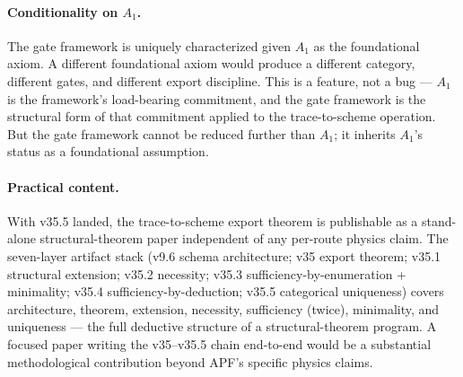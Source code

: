 \paragraph{Conditionality on $A_1$.} The gate framework is uniquely characterized given $A_1$ as the foundational axiom. A different foundational axiom would produce a different category, different gates, and different export discipline. This is a feature, not a bug --- $A_1$ is the framework's load-bearing commitment, and the gate framework is the structural form of that commitment applied to the trace-to-scheme operation. But the gate framework cannot be reduced further than $A_1$; it inherits $A_1$'s status as a foundational assumption.

\paragraph{Practical content.} With v35.5 landed, the trace-to-scheme export theorem is publishable as a stand-alone structural-theorem paper independent of any per-route physics claim. The seven-layer artifact stack (v9.6 schema architecture; v35 export theorem; v35.1 structural extension; v35.2 necessity; v35.3 sufficiency-by-enumeration + minimality; v35.4 sufficiency-by-deduction; v35.5 categorical uniqueness) covers architecture, theorem, extension, necessity, sufficiency (twice), minimality, and uniqueness --- the full deductive structure of a structural-theorem program. A focused paper writing the v35--v35.5 chain end-to-end would be a substantial methodological contribution beyond APF's specific physics claims.
